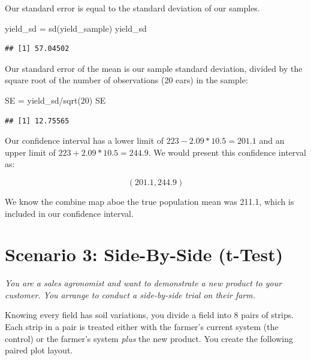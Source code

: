 \documentclass[
]{book}
\newenvironment{Shaded}{\begin{snugshade}}{\end{snugshade}}
\newcommand{\DecValTok}[1]{\textcolor[rgb]{0.00,0.00,0.81}{#1}}
\newcommand{\FunctionTok}[1]{\textcolor[rgb]{0.00,0.00,0.00}{#1}}
\newcommand{\NormalTok}[1]{#1}
\newcommand{\OtherTok}[1]{\textcolor[rgb]{0.56,0.35,0.01}{#1}}
\newcommand{\SpecialCharTok}[1]{\textcolor[rgb]{0.00,0.00,0.00}{#1}}
\begin{document}
Our standard error is equal to the standard deviation of our samples.

\begin{Shaded}
\begin{Highlighting}[]
\NormalTok{yield\_sd }\OtherTok{=} \FunctionTok{sd}\NormalTok{(yield\_sample)}
\NormalTok{yield\_sd}
\end{Highlighting}
\end{Shaded}

\begin{verbatim}
## [1] 57.04502
\end{verbatim}

Our standard error of the mean is our sample standard deviation, divided by the square root of the number of observations (20 ears) in the sample:

\begin{Shaded}
\begin{Highlighting}[]
\NormalTok{SE }\OtherTok{=}\NormalTok{ yield\_sd}\SpecialCharTok{/}\FunctionTok{sqrt}\NormalTok{(}\DecValTok{20}\NormalTok{)}
\NormalTok{SE}
\end{Highlighting}
\end{Shaded}

\begin{verbatim}
## [1] 12.75565
\end{verbatim}

Our confidence interval has a lower limit of \(223 - 2.09*10.5 = 201.1\) and an upper limit of \(223 + 2.09*10.5 = 244.9\). We would present this confidence interval as:

\[ (201.1,244.9) \]

We know the combine map aboe the true population mean was 211.1, which is included in our confidence interval.

\hypertarget{scenario-3-side-by-side-t-test}{%
\section{Scenario 3: Side-By-Side (t-Test)}\label{scenario-3-side-by-side-t-test}}

\emph{You are a sales agronomist and want to demonstrate a new product to your customer. You arrange to conduct a side-by-side trial on their farm.}

Knowing every field has soil variations, you divide a field into 8 pairs of strips. Each strip in a pair is treated either with the farmer's current system (the control) or the farmer's system \emph{plus} the new product. You create the following paired plot layout.
\end{document}
